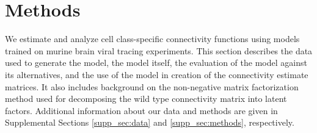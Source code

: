 \section{Methods}
\label{sec:methods}

We estimate and analyze cell class-specific connectivity functions using models trained on murine brain viral tracing experiments.
This section describes the data used to generate the model, the model itself, the evaluation of the model against its alternatives, and the use of the model in creation of the connectivity estimate matrices.
It also includes background on the non-negative matrix factorization method used for decomposing the wild type connectivity matrix into latent factors.
Additional information about our data and methods are given in Supplemental Sections \ref{supp_sec:data} and \ref{supp_sec:methods}, respectively.

